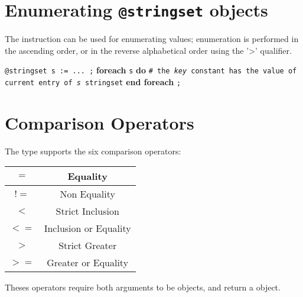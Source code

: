 \section{Enumerating \texttt{@stringset} objects}


The  instruction can be used for enumerating  values; enumeration is performed in the ascending order, or in the reverse alphabetical order using the '>' qualifier.

\texttt{@stringset s := ... ;}\newline
\textbf{foreach} \texttt {s} \textbf {do}\newline
\texttt{\# the \emph{key} constant has the value of current entry of \emph{s} stringset}\newline
\textbf{end foreach} \texttt{;}







\section{Comparison Operators}

The  type supports the six comparison operators:\newline

\begin{tabular}{|c|c|}
\hline
$=$ & Equality \\
\hline
$!=$ & Non Equality \\
\hline
$<$  & Strict Inclusion \\
\hline
$<=$  & Inclusion or Equality \\
\hline
$>$  & Strict Greater \\
\hline
$>=$  & Greater or Equality \\
\hline
\end{tabular}

Theses operators require both arguments to be  objects, and return a  object.


